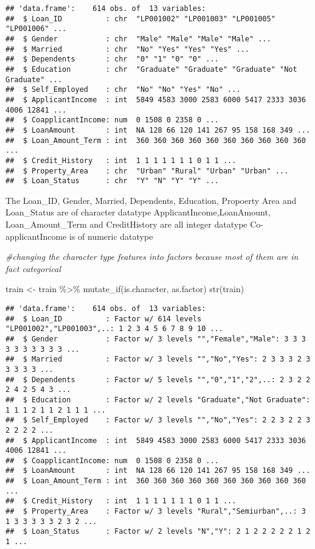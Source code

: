 \documentclass[
]{article}
\newenvironment{Shaded}{\begin{snugshade}}{\end{snugshade}}
\newcommand{\CommentTok}[1]{\textcolor[rgb]{0.56,0.35,0.01}{\textit{#1}}}
\newcommand{\FunctionTok}[1]{\textcolor[rgb]{0.00,0.00,0.00}{#1}}
\newcommand{\NormalTok}[1]{#1}
\newcommand{\OtherTok}[1]{\textcolor[rgb]{0.56,0.35,0.01}{#1}}
\newcommand{\SpecialCharTok}[1]{\textcolor[rgb]{0.00,0.00,0.00}{#1}}
\begin{document}
\begin{verbatim}
## 'data.frame':    614 obs. of  13 variables:
##  $ Loan_ID          : chr  "LP001002" "LP001003" "LP001005" "LP001006" ...
##  $ Gender           : chr  "Male" "Male" "Male" "Male" ...
##  $ Married          : chr  "No" "Yes" "Yes" "Yes" ...
##  $ Dependents       : chr  "0" "1" "0" "0" ...
##  $ Education        : chr  "Graduate" "Graduate" "Graduate" "Not Graduate" ...
##  $ Self_Employed    : chr  "No" "No" "Yes" "No" ...
##  $ ApplicantIncome  : int  5849 4583 3000 2583 6000 5417 2333 3036 4006 12841 ...
##  $ CoapplicantIncome: num  0 1508 0 2358 0 ...
##  $ LoanAmount       : int  NA 128 66 120 141 267 95 158 168 349 ...
##  $ Loan_Amount_Term : int  360 360 360 360 360 360 360 360 360 360 ...
##  $ Credit_History   : int  1 1 1 1 1 1 1 0 1 1 ...
##  $ Property_Area    : chr  "Urban" "Rural" "Urban" "Urban" ...
##  $ Loan_Status      : chr  "Y" "N" "Y" "Y" ...
\end{verbatim}

The Loan\_ID, Gender, Married, Dependents, Education, Propoerty Area and
Loan\_Status are of character datatype ApplicantIncome,LoanAmount,
Loan\_Amount\_Term and CreditHistory are all integer datatype
Co-applicantIncome is of numeric datatype

\begin{Shaded}
\begin{Highlighting}[]
\CommentTok{\#changing the character type features into factors because most of them are in fact categorical}

\NormalTok{train }\OtherTok{\textless{}{-}}\NormalTok{ train }\SpecialCharTok{\%\textgreater{}\%} \FunctionTok{mutate\_if}\NormalTok{(is.character, as.factor)}
\FunctionTok{str}\NormalTok{(train)}
\end{Highlighting}
\end{Shaded}

\begin{verbatim}
## 'data.frame':    614 obs. of  13 variables:
##  $ Loan_ID          : Factor w/ 614 levels "LP001002","LP001003",..: 1 2 3 4 5 6 7 8 9 10 ...
##  $ Gender           : Factor w/ 3 levels "","Female","Male": 3 3 3 3 3 3 3 3 3 3 ...
##  $ Married          : Factor w/ 3 levels "","No","Yes": 2 3 3 3 2 3 3 3 3 3 ...
##  $ Dependents       : Factor w/ 5 levels "","0","1","2",..: 2 3 2 2 2 4 2 5 4 3 ...
##  $ Education        : Factor w/ 2 levels "Graduate","Not Graduate": 1 1 1 2 1 1 2 1 1 1 ...
##  $ Self_Employed    : Factor w/ 3 levels "","No","Yes": 2 2 3 2 2 3 2 2 2 2 ...
##  $ ApplicantIncome  : int  5849 4583 3000 2583 6000 5417 2333 3036 4006 12841 ...
##  $ CoapplicantIncome: num  0 1508 0 2358 0 ...
##  $ LoanAmount       : int  NA 128 66 120 141 267 95 158 168 349 ...
##  $ Loan_Amount_Term : int  360 360 360 360 360 360 360 360 360 360 ...
##  $ Credit_History   : int  1 1 1 1 1 1 1 0 1 1 ...
##  $ Property_Area    : Factor w/ 3 levels "Rural","Semiurban",..: 3 1 3 3 3 3 3 2 3 2 ...
##  $ Loan_Status      : Factor w/ 2 levels "N","Y": 2 1 2 2 2 2 2 1 2 1 ...
\end{verbatim}
\end{document}
